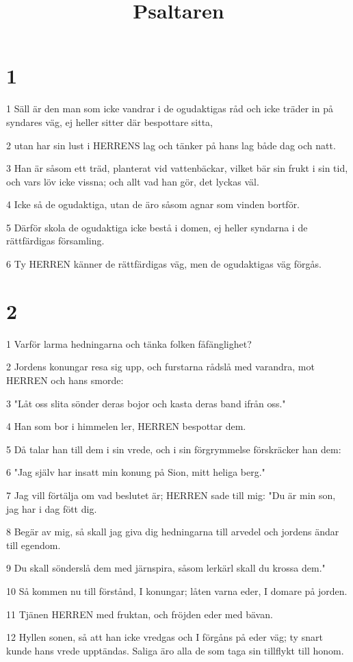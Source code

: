 

\title{Psaltaren}


\chapter{1}

\par 1 Säll är den man som icke vandrar i de ogudaktigas råd och icke träder in på syndares väg, ej heller sitter där bespottare sitta,
\par 2 utan har sin lust i HERRENS lag och tänker på hans lag både dag och natt.
\par 3 Han är såsom ett träd, planterat vid vattenbäckar, vilket bär sin frukt i sin tid, och vars löv icke vissna; och allt vad han gör, det lyckas väl.
\par 4 Icke så de ogudaktiga, utan de äro såsom agnar som vinden bortför.
\par 5 Därför skola de ogudaktiga icke bestå i domen, ej heller syndarna i de rättfärdigas församling.
\par 6 Ty HERREN känner de rättfärdigas väg, men de ogudaktigas väg förgås.

\chapter{2}

\par 1 Varför larma hedningarna och tänka folken fåfänglighet?
\par 2 Jordens konungar resa sig upp, och furstarna rådslå med varandra, mot HERREN och hans smorde:
\par 3 "Låt oss slita sönder deras bojor och kasta deras band ifrån oss."
\par 4 Han som bor i himmelen ler, HERREN bespottar dem.
\par 5 Då talar han till dem i sin vrede, och i sin förgrymmelse förskräcker han dem:
\par 6 "Jag själv har insatt min konung på Sion, mitt heliga berg."
\par 7 Jag vill förtälja om vad beslutet är; HERREN sade till mig: "Du är min son, jag har i dag fött dig.
\par 8 Begär av mig, så skall jag giva dig hedningarna till arvedel och jordens ändar till egendom.
\par 9 Du skall sönderslå dem med järnspira, såsom lerkärl skall du krossa dem."
\par 10 Så kommen nu till förstånd, I konungar; låten varna eder, I domare på jorden.
\par 11 Tjänen HERREN med fruktan, och fröjden eder med bävan.
\par 12 Hyllen sonen, så att han icke vredgas och I förgåns på eder väg; ty snart kunde hans vrede upptändas. Saliga äro alla de som taga sin tillflykt till honom.

